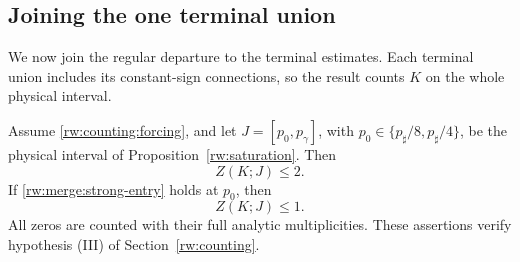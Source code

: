 \subsection{Joining the one terminal union}

We now join the regular departure to the terminal estimates. Each
terminal union includes its constant-sign connections, so the result
counts $K$ on the whole physical interval.

\begin{proposition}
\label{rw:anchored-unions}
Assume \eqref{rw:counting:forcing}, and let
$J=[p_0,p_\gamma]$, with
$p_0\in\{p_\sharp/8,p_\sharp/4\}$, be the physical interval
of Proposition~\ref{rw:saturation}. Then
\begin{equation}\label{rw:merge:two}
 Z(K;J)\le2.
\end{equation}
If \eqref{rw:merge:strong-entry} holds at $p_0$, then
\begin{equation}\label{rw:merge:one}
 Z(K;J)\le1.
\end{equation}
All zeros are counted with their full analytic multiplicities.
These assertions verify hypothesis \textup{(III)} of
Section~\ref{rw:counting}.
\end{proposition}

